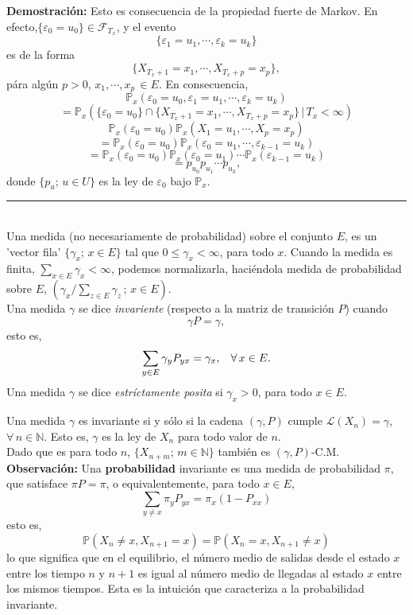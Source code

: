 \documentclass[a4paper]{article}
\newcommand{\prob}{\mathbb{P}}
\numberwithin{equation}{subsection}
\numberwithin{definicion}{subsection}
\def\N{\mathbb N}
\begin{document}
\textbf{Demostración: }Esto es consecuencia de la propiedad fuerte de Markov. En efecto,\newline $\{\varepsilon_0 = u_0\}\in \mathcal{F}_{T_x}$, y el evento
\[\{\varepsilon_1 = u_1,\cdots,\varepsilon_k = u_k\}\]
es de la forma
\[\{X_{T_x+1}=x_1,\cdots,X_{T_x+p}=x_p\},\]
pára algún $p>0$, $x_1,\cdots,x_p\,\in E$. En consecuencia,
\[\prob_x\left(\varepsilon_0 = u_0,\varepsilon_1 = u_1,\cdots, \varepsilon_k = u_k\right)\]
\[= \prob_x\left(\{\varepsilon_0 = u_0\}\cap\{X_{T_x+1}=x_1,\cdots,X_{T_x +p}=x_p\}\,|\,T_x <\infty\right)\]
\[\prob_x\left(\varepsilon_0 =u_0\right)\prob_x\left(X_1=u_1,\cdots,X_p =x_p\right)\]
\[=\prob_x\left(\varepsilon_0=u_0\right)\prob_x\left(\varepsilon_0=u_1,\cdots,\varepsilon_{k-1}=u_k\right)\]
\[=\prob_x\left(\varepsilon_0 =u_0\right)\prob_x\left(\varepsilon_0=u_1\right)\cdots\prob_x\left(\varepsilon_{k-1}=u_k\right)\]
\[=p_{u_0}p_{u_1}\cdots p_{u_k},\]
donde $\{p_u;\,u\in U\}$ es la ley de $\varepsilon_0$ bajo $\prob_x$.\\
\rule{0.7em}{0.7em}\\ \newline
Una medida (no necesariamente de probabilidad) sobre el conjunto $E$, es un 'vector fila' $\{\gamma_x;\,x\in E\}$ tal que $0\leq \gamma_x < \infty$, para todo $x$. Cuando la medida es finita, $\sum_{x\in E}\gamma_x <\infty$, podemos normalizarla, haciéndola medida de probabilidad sobre $E$, $\left(\gamma_x / \sum_{z\in E}\gamma_z\, ;\,x\in E\right)$.\\ Una medida $\gamma$ se dice \textit{invariente} (respecto a la matriz de transición $P$) cuando
\[\gamma P = \gamma,\]
esto es, 
\[\sum_{y\in E}\gamma_y P_{yx} = \gamma_x,\hspace{0.3cm}\forall\,x\in E.\]
Una medida $\gamma$ se dice \textit{estríctamente posita} si $\gamma_x >0$, para todo $x\in E$.\\ \newline

Una medida $\gamma$ es invariante si y sólo si  la cadena $(\gamma,P)$ cumple $\mathcal{L}(X_n)=\gamma$, $\forall\,n\in \N$. Esto es, $\gamma$ es la ley de $X_n$ para todo valor de $n$.\\ Dado que es para todo $n$, $\{X_{n+m};\,m\in\N\}$ también es $(\gamma,P)$-C.M.\\ \newline
\textbf{Observación: }Una \textbf{probabilidad} invariante es una medida de probabilidad  $\pi$, que satisface $\pi P = \pi$, o equivalentemente, para todo $x\in E$,
\[\sum_{y\neq x}\pi_y P_{yx} = \pi_x\left(1- P_{xx}\right)\]
esto es,
\[\prob\left(X_n\neq x ,X_{n+1}=x\right) = \prob\left(X_n = x,X_{n+1}\neq x\right)\]
lo que significa que en el equilibrio, el número medio de salidas  desde el estado $x$ entre los tiempo $n$ y $n+1$ es igual al número medio de llegadas al estado $x$ entre los mismos tiempos. Esta es la intuición que caracteriza a la probabilidad invariante.
\end{document}
